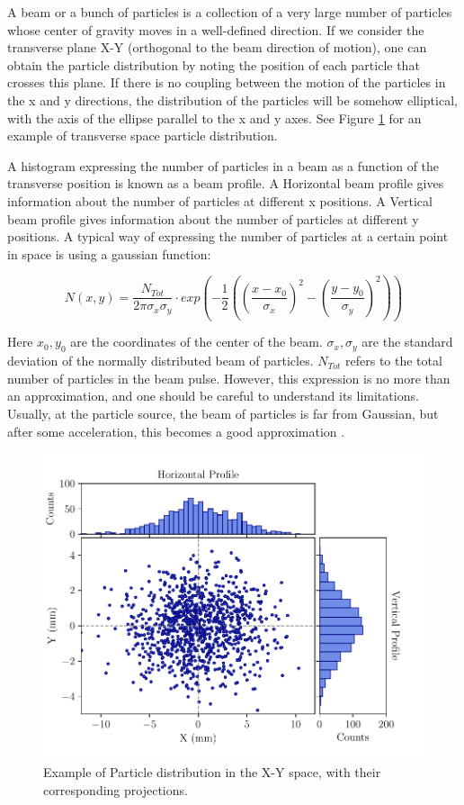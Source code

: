 A beam or a bunch of particles is a collection of a very large number of particles whose center of gravity moves in a well-defined direction. If we consider the transverse plane X-Y (orthogonal to the beam direction of motion), one can obtain the particle distribution by noting the position of each particle that crosses this plane. If there is no coupling between the motion of the particles in the x and y directions, the distribution of the particles will be somehow elliptical, with the axis of the ellipse parallel to the x and y axes. See Figure \ref{fig:TransversePlane} for an example of transverse space particle distribution. 

A histogram expressing the number of particles in a beam as a function of the transverse position is known as a beam profile. A Horizontal beam profile gives information about the number of particles at different x positions. A Vertical beam profile gives information about the number of particles at different y positions. A typical way of expressing the number of particles at a certain point in space is using a gaussian function:

\begin{equation}
    N(x,y) = \frac{N_{Tot}}{2\pi\sigma_x \sigma_y}\cdot exp\left(-\frac{1}{2}\left(\left(\frac{x-x_0}{\sigma_x}\right)^2 -\left(\frac{y-y_0}{\sigma_y}\right)^2\right)\right)
    \label{eq:GaussianDist}
\end{equation}

Here $x_0 , y_0$ are the coordinates of the center of the beam. $\sigma_x , \sigma_y$ are the standard deviation of the normally distributed beam of particles. $N_{Tot}$ refers to the total number of particles in the beam pulse. However, this expression is no more than an approximation, and one should be careful to understand its limitations. Usually, at the particle source, the beam of particles is far from Gaussian, but after some acceleration, this becomes a good approximation \parencite*[][]{ref:BookAccPhysics}.

\begin{figure}[t]
    \centering
    \includegraphics[width=0.9\columnwidth]{Figure_ParticlePositionExample/ParticlePosition.pdf}
    \caption{Example of Particle distribution in the X-Y space, with their corresponding projections.}
    \label{fig:TransversePlane}
\end{figure}

